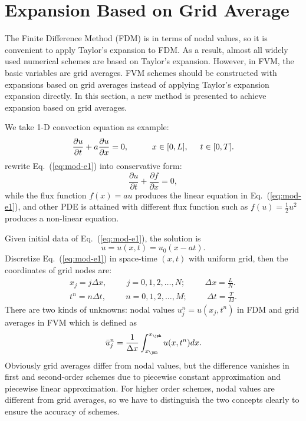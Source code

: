 \documentclass[]{article}
\newcommand{\diff}{d}
\begin{document}
\section{Expansion Based on Grid Average}
\label{sec:expansion-based-grid}

The Finite Difference Method (FDM) is in terms of nodal values,
so it is convenient to apply Taylor's expansion to FDM. As a result,
almost all widely used numerical schemes are based on Taylor's expansion. 
However, in FVM, the basic variables are grid averages.  FVM schemes should
be constructed with expansions based on grid averages
instead of applying Taylor's expansion expansion directly. 
In this section, a new method is presented to achieve expansion based on grid
averages.

We take 1-D convection equation as example:
\begin{equation}
  \dfrac{\partial u}{\partial t}+a\dfrac{\partial
    u}{\partial x}=0,\hspace{1cm}x\in [0,L],\hspace{5mm} t\in [0,T].
  \label{eq:mod-e1} 
\end{equation}
rewrite Eq.~(\ref{eq:mod-e1}) into conservative form:
\begin{equation}
  \dfrac{\partial u}{\partial t}+\dfrac{\partial f
  }{\partial x}=0,
  \label{eq:conservative-convection}
\end{equation}
while the flux function $f(x) =au$ produces the linear equation in
Eq.~(\ref{eq:mod-e1}), and other PDE is attained with different flux
function such as $f(u) = \frac 12 u^2$ produces a non-linear equation.

Given initial data of Eq.~(\ref{eq:mod-e1}), the solution is
\begin{equation*}
  u = u(x,t) = u_0(x-at).
\end{equation*}
Discretize Eq.~(\ref{eq:mod-e1}) in space-time $(x, t)$ with uniform grid,
then the coordinates of grid nodes are:
\begin{align*}
  x_j=j \Delta x,\hspace{1cm} j=0,1,2,\ldots,N;\hspace{1cm} \Delta x
  =\frac{L}{N}. \\
  t^n = n\Delta t,\hspace{1cm} n=0,1,2,\ldots,M;\hspace{1cm} \Delta t
  =\frac{T}{M}.
\end{align*}
There are two kinds of unknowns: nodal values $u^n_j=u(x_j,t^n)$ in FDM
and grid averages in FVM which is defined as
\begin{equation}
  \bar u_{j}^n = \frac{1}{\Delta x}\int_{x_{\jmh}}^{x_{\jph}}
  u(x,t^n)\diff x.
  \label{eq:def_grid_avg}
\end{equation}
Obviously grid averages differ from nodal values, but the difference
vanishes in first and second-order schemes due to piecewise constant
approximation and piecewise linear approximation. For higher order
schemes, nodal values are different from grid averages, so we have to
distinguish the two concepts clearly to ensure the accuracy of
schemes.
\end{document}
